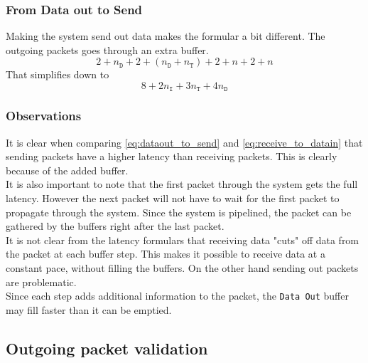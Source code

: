 \subsubsection{From Data out to Send}
Making the system send out data makes the formular a bit different. The outgoing
packets goes through an extra buffer.
\begin{equation*}
   2 + n_{\mathtt{D}} + 2 + (n_{\mathtt{D}} + n_{\mathtt{T}}) + 2 + n + 2 + n
\end{equation*}
That simplifies down to
\begin{equation} \label{eq:dataout_to_send}
    8 + 2n_{\mathtt{I}} + 3n_{\mathtt{T}} + 4n_{\mathtt{D}}
\end{equation}

\subsubsection{Observations}
It is clear when comparing \autoref{eq:dataout_to_send} and
\autoref{eq:receive_to_datain} that sending packets have a higher latency than
receiving packets. This is clearly because of the added buffer.\\
It is also important to note that the first packet through the system gets the
full latency. However the next packet will not have to wait for the first packet
to propagate through the system. Since the system is pipelined, the packet
can be gathered by the buffers right after the last packet.\\
It is not clear
from the latency formulars that receiving data "cuts" off data from the packet
at each buffer step. This makes it possible to receive data at a constant pace,
without filling the buffers. On the other hand sending out packets are
problematic. \\
Since each step adds additional information to the packet, the \texttt{Data Out}
buffer may fill faster than it can be emptied.


\subsection{Outgoing packet validation}

